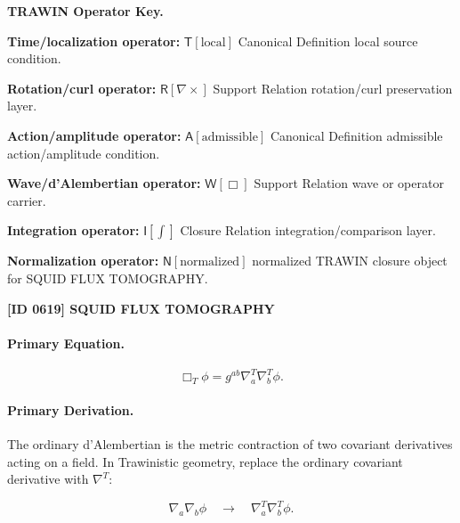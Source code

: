 \par\vspace{0.45\baselineskip}
\noindent\begin{minipage}[t]{\linewidth}
\begingroup
\small
\raggedright
\textbf{TRAWIN Operator Key.}\par
\noindent\textbf{Time/localization operator:} $\mathsf{T}\!\left[\mathrm{local}\right]$ Canonical Definition local source condition.\par
\noindent\textbf{Rotation/curl operator:} $\mathsf{R}\!\left[\nabla\times\right]$ Support Relation rotation/curl preservation layer.\par
\noindent\textbf{Action/amplitude operator:} $\mathsf{A}\!\left[\mathrm{admissible}\right]$ Canonical Definition admissible action/amplitude condition.\par
\noindent\textbf{Wave/d'Alembertian operator:} $\mathsf{W}\!\left[\Box\right]$ Support Relation wave or operator carrier.\par
\noindent\textbf{Integration operator:} $\mathsf{I}\!\left[\int\right]$ Closure Relation integration/comparison layer.\par
\noindent\textbf{Normalization operator:} $\mathsf{N}\!\left[\mathrm{normalized}\right]$ normalized TRAWIN closure object for SQUID FLUX TOMOGRAPHY.\par
\endgroup
\end{minipage}

\clearpage
\noindent\textbf{[ID 0619] SQUID FLUX TOMOGRAPHY}\par
\vspace{0.35em}
\paragraph{Primary Equation.}
\begin{equation}
\Box_T\phi
=
g^{ab}
\nabla^{T}_{a}
\nabla^{T}_{b}
\phi .
\end{equation}

\paragraph{Primary Derivation.}
The ordinary d'Alembertian is the metric contraction of two covariant derivatives acting on a field.  
In Trawinistic geometry, replace the ordinary covariant derivative with $\nabla^T$:

\begin{equation}
\nabla_a\nabla_b\phi
\quad\longrightarrow\quad
\nabla^T_a\nabla^T_b\phi .
\end{equation}

